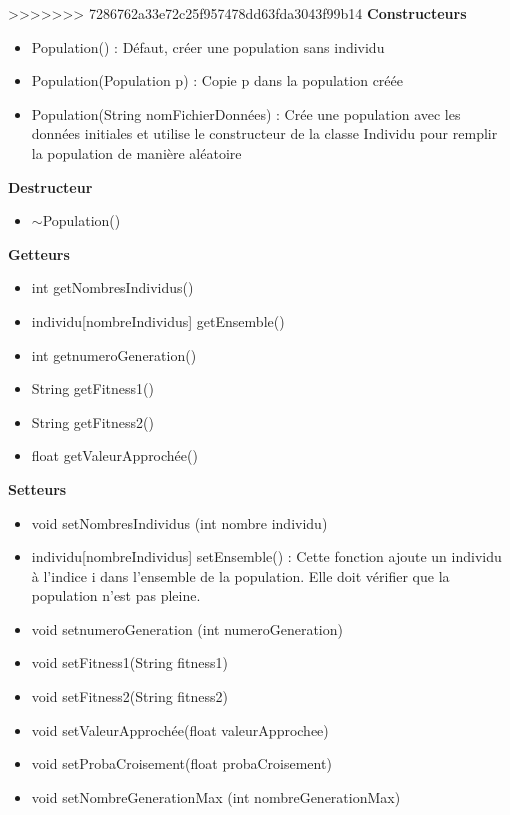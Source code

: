 \documentclass[a4paper,11pt]{article}
\begin{document}
>>>>>>> 7286762a33e72c25f957478dd63fda3043f99b14
			\textbf{Constructeurs}
						\begin{itemize}
							\item Population() : Défaut, créer une population sans individu
							\item Population(Population p) : Copie p dans la population créée
							\item Population(String nomFichierDonnées) : Crée une population avec les données initiales et utilise le constructeur de la classe Individu pour remplir la population de manière aléatoire\\
						\end{itemize}
			\textbf{Destructeur}
					\begin{itemize}
							\item $\sim$Population()\\
					\end{itemize}
			\textbf{Getteurs}
					\begin{itemize}
							\item int getNombresIndividus()
							\item individu[nombreIndividus] getEnsemble()
							\item int getnumeroGeneration()
							\item String getFitness1()
							\item String getFitness2()
							\item float getValeurApprochée()\\
					\end{itemize}
			\textbf{Setteurs}
					\begin{itemize}
							\item void setNombresIndividus (int nombre individu)
							\item individu[nombreIndividus] setEnsemble() : Cette fonction ajoute un individu à l’indice i dans l’ensemble de la population.
																			Elle doit vérifier que la population n’est pas pleine.
							\item void setnumeroGeneration (int numeroGeneration)
							\item void setFitness1(String fitness1)
							\item void setFitness2(String fitness2)
							\item void setValeurApprochée(float valeurApprochee)
							\item void setProbaCroisement(float probaCroisement)
							\item void setNombreGenerationMax (int nombreGenerationMax)\\
					\end{itemize}
\end{document}
